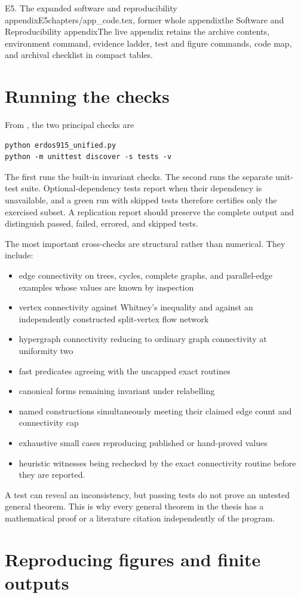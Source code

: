 \begin{offcut}{E5. The expanded software and reproducibility appendix}{E5}{chapters/app\_code.tex, former whole appendix}{the Software and Reproducibility appendix}{The live appendix retains the archive contents, environment command, evidence ladder, test and figure commands, code map, and archival checklist in compact tables.}
\section{Running the checks}

From , the two principal checks are

\begin{verbatim}
python erdos915_unified.py
python -m unittest discover -s tests -v
\end{verbatim}

The first runs the built-in invariant checks. The second runs the separate unit-test suite. Optional-dependency tests report  when their dependency is unavailable, and a green run with skipped tests therefore certifies only the exercised subset. A replication report should preserve the complete output and distinguish passed, failed, errored, and skipped tests.

The most important cross-checks are structural rather than numerical. They include:

\begin{itemize}
  \item edge connectivity on trees, cycles, complete graphs, and parallel-edge examples whose values are known by inspection
  \item vertex connectivity against Whitney's inequality and against an independently constructed split-vertex flow network
  \item hypergraph connectivity reducing to ordinary graph connectivity at uniformity two
  \item fast predicates agreeing with the uncapped exact routines
  \item canonical forms remaining invariant under relabelling
  \item named constructions simultaneously meeting their claimed edge count and connectivity cap
  \item exhaustive small cases reproducing published or hand-proved values
  \item heuristic witnesses being rechecked by the exact connectivity routine before they are reported.
\end{itemize}

A test can reveal an inconsistency, but passing tests do not prove an untested general theorem. This is why every general theorem in the thesis has a mathematical proof or a literature citation independently of the program.

\section{Reproducing figures and finite outputs}


\end{offcut}
